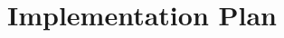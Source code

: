 \documentclass[11pt]{article}
\begin{document}
\section{Implementation Plan}\label{sec:plan}

\end{document}
